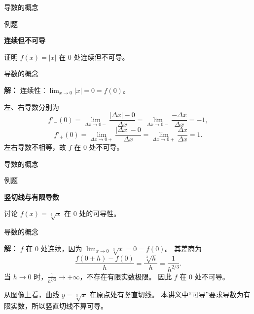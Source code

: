 \documentclass[aspectratio=169,10pt,fontset=fandol]{ctexbeamer}
\newenvironment{idea}{\par\noindent\textbf{思路}\quad}{\par\vspace{0.4em}}
\begin{document}
\begin{frame}[t,fragile]{导数的概念}
\footnotesize
\begin{block}{例题}
{\footnotesize
\textbf{连续但不可导}\par

证明 $f(x)=|x|$ 在 $0$ 处连续但不可导。

}
\end{block}
\end{frame}
\begin{frame}[t,fragile]{导数的概念}
\footnotesize
{\footnotesize
\textbf{解：}
连续性：$\lim_{x\to0}|x|=0=f(0)$。

左、右导数分别为
\[
f'_-(0)=\lim_{\Delta x\to0-}\frac{|\Delta x|-0}{\Delta x}
=\lim_{\Delta x\to0-}\frac{-\Delta x}{\Delta x}=-1,
\]
\[
f'_+(0)=\lim_{\Delta x\to0+}\frac{|\Delta x|-0}{\Delta x}
=\lim_{\Delta x\to0+}\frac{\Delta x}{\Delta x}=1.
\]
左右导数不相等，故 $f$ 在 $0$ 处不可导。

}
\end{frame}
\begin{frame}[t,fragile]{导数的概念}
\footnotesize
\begin{block}{例题}
{\footnotesize
\textbf{竖切线与有限导数}\par

讨论 $f(x)=\sqrt[3]{x}$ 在 $0$ 处的可导性。

}
\end{block}
\end{frame}
\begin{frame}[t,fragile]{导数的概念}
\footnotesize
{\footnotesize
\textbf{解：}
$f$ 在 $0$ 处连续，因为 $\lim_{x\to0}\sqrt[3]{x}=0=f(0)$。 其差商为
\[
\frac{f(0+h)-f(0)}{h}=\frac{\sqrt[3]{h}}{h}=\frac1{h^{2/3}}.
\]
当 $h\to0$ 时，$\frac1{h^{2/3}}\to+\infty$，不存在有限实数极限。 因此 $f$ 在 $0$ 处不可导。

从图像上看，曲线 $y=\sqrt[3]{x}$ 在原点处有竖直切线。 本讲义中“可导”要求导数为有限实数，所以竖直切线不算可导。

}
\end{frame}
\end{document}

